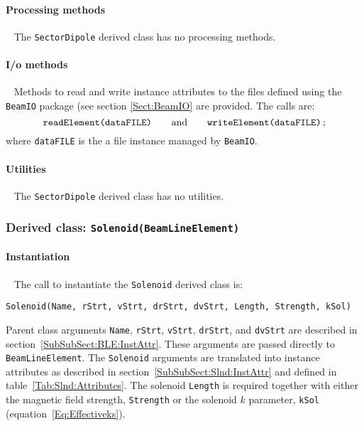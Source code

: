 \paragraph{Processing methods} ~\newline
\noindent
The \texttt{SectorDipole} derived class has no processing methods.

\paragraph{I/o methods} ~\newline
\noindent
Methods to read and write instance attributes to the files defined
using the \texttt{BeamIO} package (see section \ref{Sect:BeamIO} are
provided.
The calls are:
\begin{equation}
  \texttt{readElement(dataFILE)} \quad \quad {\rm and }
      \quad \quad \texttt{writeElement(dataFILE)} \,; \nonumber
\end{equation}
where \texttt{dataFILE} is the a file instance managed by \texttt{BeamIO}.

\paragraph{Utilities} ~\newline
\noindent
The \texttt{SectorDipole} derived class has no utilities.

\FloatBarrier

\subsubsection{Derived class: \texttt{Solenoid(BeamLineElement)}}

\paragraph{Instantiation} ~\newline
\noindent
The call to instantiate the \texttt{Solenoid} derived class is:
\begin{center}
  \texttt{Solenoid(Name, rStrt, vStrt, drStrt, dvStrt,
          Length, Strength, kSol)} 
\end{center}
Parent class arguments \texttt{Name}, \texttt{rStrt}, \texttt{vStrt},
\texttt{drStrt}, and \texttt{dvStrt} are described in
section~\ref{SubSubSect:BLE:InstAttr}.
These arguments are passed directly to \texttt{BeamLineElement}.
The \texttt{Solenoid} arguments are translated into instance
attributes as described in section~\ref{SubSubSect:Slnd:InstAttr} and
defined in table~\ref{Tab:Slnd:Attributes}.
The solenoid \texttt{Length} is required together with either the
magnetic field strength, \texttt{Strength} or the solenoid $k$
parameter, \texttt{kSol} (equation~\ref{Eq:Effectiveks}).  

